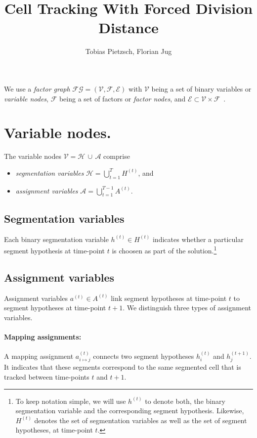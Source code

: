\documentclass[a4paper]{article}
\newcommand{\hypset}[1]{\ensuremath{H^{(#1)}}\xspace}
\newcommand{\vhset}[1]{\hypset{#1}}
\newcommand{\Ht}[1][t]{\vhset{#1}}
\newcommand{\vht}[1][t]{\ensuremath{h^{(#1)}}\xspace}
\newcommand{\vhti}[2][t]{\ensuremath{h^{(#1)}_{#2}}\xspace}
\newcommand{\vaset}[1]{\ensuremath{A^{(#1)}}\xspace}
\newcommand{\At}[1][t]{\vaset{#1}}
\newcommand{\vat}[1][t]{\ensuremath{a^{(#1)}}\xspace}
\newcommand{\vam}[3]{\ensuremath{a^{(#1)}_{#2\mapsto#3}}\xspace}
\newcommand{\FGV}{\ensuremath{\mathcal{V}}\xspace}
\newcommand{\FGVH}{\ensuremath{\mathcal{H}}\xspace}
\newcommand{\FGVA}{\ensuremath{\mathcal{A}}\xspace}
\newcommand{\FGF}{\ensuremath{\mathcal{F}}\xspace}
\newcommand{\FGE}{\ensuremath{\mathcal{E}}\xspace}
\begin{document}
\title{Cell Tracking With Forced Division Distance}
\author{Tobias Pietzsch, Florian Jug}
\maketitle



We use a \emph{factor graph} $\mathcal{FG} = (\FGV, \FGF, \FGE)$ with
\FGV being a set of binary variables or \emph{variable nodes},
\FGF being a set of factors or \emph{factor nodes}, and
$\FGE \subset \FGV \times \FGF$~\cite{Frey:1997p3532}.
%
%
\section{Variable nodes.}
%
%
The variable nodes $\FGV = \FGVH\, \cup\, \FGVA$ comprise
\begin{itemize}
\item \emph{segmentation variables} $\FGVH = \bigcup_{t=1}^T \Ht$, and 
\item \emph{assignment variables} $\FGVA = \bigcup_{t=1}^{T-1} \At$.
\end{itemize}

%
\subsection{Segmentation variables}
Each binary segmentation variable $\vht \in \Ht$ indicates whether a particular segment hypothesis at time-point $t$ is choosen as part of the solution.\footnote{%
  To keep notation simple, we will use \vht to denote both, the binary segmentation variable and the corresponding segment hypothesis.
  Likewise, \Ht denotes the set of segmentation variables as well as the set of segment hypotheses, at time-point $t$.}

%
\subsection{Assignment variables}
Assignment variables $\vat \in \At$ link segment hypotheses at time-point $t$ to segment hypotheses at time-point $t+1$.
We distinguish three types of assignment variables.
%
\paragraph{Mapping assignments:}
A mapping assignment \vam{t}{i}{j} connects two segment hypotheses \vhti{i} and \vhti[t+1]{j}.
It indicates that these segments correspond to the same segmented cell that is tracked between time-points $t$ and $t+1$.
%
\end{document}

